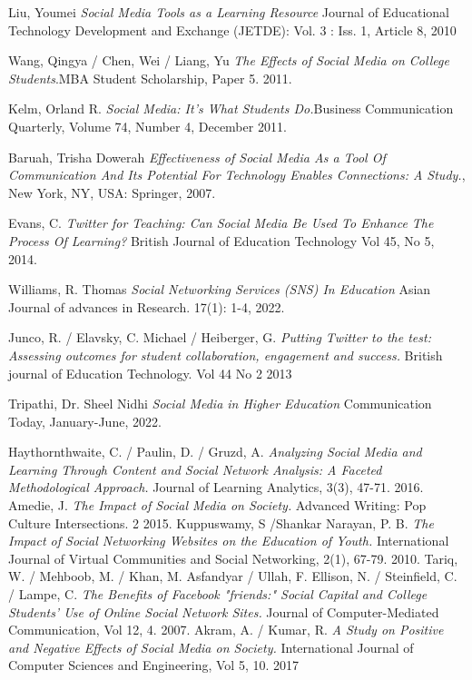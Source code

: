 \documentclass[lettersize,journal]{IEEEtran}
\begin{document}
\begin{thebibliography}{}


        Liu, Youmei {\it{Social Media Tools as a Learning Resource}} Journal of Educational Technology Development and Exchange (JETDE): Vol. 3 : Iss. 1, Article 8, 2010

        Wang, Qingya / Chen, Wei / Liang, Yu {\it{The Effects of Social Media on College Students}}.MBA Student Scholarship, Paper 5. 2011.

    Kelm, Orland R. {\it{Social Media: It's What Students Do.}}Business Communication Quarterly, Volume 74, Number 4, December 2011.

    Baruah, Trisha Dowerah {\it{Effectiveness of Social Media As a Tool Of Communication And Its Potential For Technology Enables Connections: A Study.}}, New York, NY, USA: Springer, 2007.

        Evans, C. {\it{Twitter for Teaching: Can Social Media Be Used To Enhance The Process Of Learning?}} British Journal of Education Technology
Vol 45, No 5, 2014.

        Williams, R. Thomas {\it{Social Networking Services (SNS) In Education}}
        Asian Journal of advances in Research. 17(1): 1-4, 2022.

        Junco, R. / Elavsky, C. Michael / Heiberger, G. {\it{Putting Twitter to
        the test: Assessing outcomes for student collaboration, engagement and
        success.}} British journal of Education Technology. Vol 44 No 2 2013

        Tripathi, Dr. Sheel Nidhi {\it{Social Media in Higher Education}}
        Communication Today, January-June, 2022.

    Haythornthwaite, C. / Paulin, D. / Gruzd, A. {\it{Analyzing Social Media
        and Learning Through Content and Social Network Analysis: A Faceted
        Methodological Approach.}} Journal of Learning Analytics, 3(3), 47-71.
        2016.
        Amedie, J. {\it{The Impact of Social Media on Society.}}
        Advanced Writing: Pop Culture Intersections. 2
        2015.
	Kuppuswamy, S /Shankar Narayan, P. B. {\it{The Impact of Social Networking Websites on the Education of Youth.}}
	International Journal of Virtual Communities and Social Networking, 2(1), 67-79.
	2010.
	Tariq, W. / Mehboob, M. / Khan, M. Asfandyar / Ullah, F.
	Ellison, N. / Steinfield, C. / Lampe, C. {\it{The Benefits of Facebook "friends:" Social Capital and College Students' Use of Online Social Network Sites.}} Journal of Computer-Mediated Communication, Vol 12, 4.
	2007.
	Akram, A. / Kumar, R. {\it{A Study on Positive and Negative Effects of Social Media on Society.}}
	International Journal of Computer Sciences and Engineering, Vol 5, 10.
	2017
\end{thebibliography}
\end{document}
